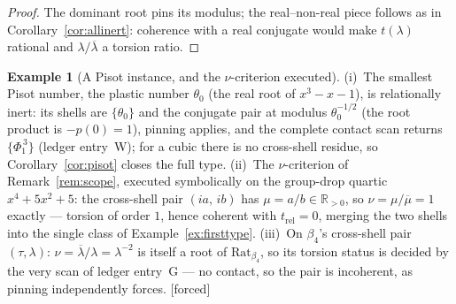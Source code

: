 \documentclass[11pt]{article}
\theoremstyle{plain}
\theoremstyle{definition}
\newtheorem{example}[theorem]{Example}
\theoremstyle{remark}
\newcommand{\R}{\mathbb{R}}
\newcommand{\Rat}{\mathrm{Rat}}
\newcommand{\F}{\textnormal{[forced]}}
\begin{document}
\begin{proof}
The dominant root pins its modulus; the real--non-real piece follows as in
Corollary~\ref{cor:allinert}: coherence with a real conjugate would make
$t(\lambda)$ rational and $\lambda/\overline{\lambda}$ a torsion ratio.
\end{proof}

\begin{example}[A Pisot instance, and the $\nu$-criterion executed]
\label{ex:pisotnu}
(i)~The smallest Pisot number, the plastic number $\theta_0$ (the real root
of $x^3-x-1$), is relationally inert: its shells are $\{\theta_0\}$ and the
conjugate pair at modulus $\theta_0^{-1/2}$ (the root product is $-p(0)=1$),
pinning applies, and the complete contact scan returns $\{\Phi_1^{\,3}\}$
(ledger entry~W); for a cubic there is no cross-shell residue, so
Corollary~\ref{cor:pisot} closes the full type. (ii)~The $\nu$-criterion of
Remark~\ref{rem:scope}, executed symbolically on the group-drop quartic
$x^4+5x^2+5$: the cross-shell pair $(ia,\,ib)$ has $\mu=a/b\in\R_{>0}$, so
$\nu=\mu/\overline{\mu}=1$ exactly --- torsion of order $1$, hence coherent
with $t_{\mathrm{rel}}=0$, merging the two shells into the single class of
Example~\ref{ex:firsttype}. (iii)~On $\beta_4$'s cross-shell pair
$(\tau,\lambda)$: $\nu=\overline{\lambda}/\lambda=\lambda^{-2}$ is itself a
root of $\Rat_{\beta_4}$, so its torsion status is decided by the very scan
of ledger entry~G --- no contact, so the pair is incoherent, as pinning
independently forces. \F
\end{example}
\end{document}
